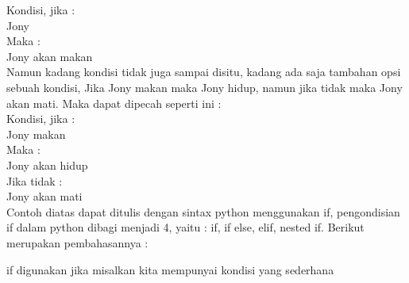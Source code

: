 \documentclass[a4paper,12pt]{report}
\begin{document}
Kondisi, jika :\\
Jony\\
Maka :\\
Jony akan makan\\

Namun kadang kondisi tidak juga sampai disitu, kadang ada saja tambahan opsi sebuah kondisi, Jika Jony makan maka Jony hidup, namun jika tidak maka Jony akan mati. Maka dapat dipecah seperti ini :\\

Kondisi, jika :\\
Jony makan\\
Maka :\\
Jony akan hidup\\
Jika tidak :\\
Jony akan mati\\
	
Contoh diatas dapat ditulis dengan sintax python menggunakan if, pengondisian if dalam python dibagi menjadi 4, yaitu : if, if else, elif, nested if. Berikut merupakan pembahasannya :

if digunakan jika misalkan kita mempunyai kondisi yang sederhana
\end{document}

